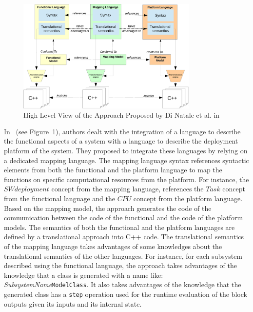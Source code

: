 \begin{figure}[ht!]
	\begin{center}
		\includegraphics[width=0.8\textwidth]{background/figs/diNatale}
		\caption{High Level View of the Approach Proposed by Di Natale et al. in~\cite{dinatale}}
		\label{fig:diNatale}
	\end{center}
\end{figure}

In~\cite{dinatale} (see Figure~\ref{fig:diNatale}), authors dealt with the integration of a language to describe the functional aspects of a system with a language to describe the deployment platform of the system. They proposed to integrate these languages by relying on a dedicated mapping language. The mapping language syntax references syntactic elements from both the functional and the platform language to map the functions on specific computational resources from the platform. For instance, the $SWdeployment$ concept from the mapping language, references the $Task$ concept from the functional language and the $CPU$ concept from the platform language. Based on the mapping model, the approach generates the code of the communication between the code of the functional and the code of the platform models. The semantics of both the functional and the platform languages are defined by a translational approach into C++ code. The translational semantics of the mapping language takes advantages of some knowledges about the translational semantics of the other languages. For instance, for each subsystem described using the functional language, the approach takes advantages of the knowledge that a class is generated with a name like: \emph{SubsystemName}\texttt{ModelClass}. It also takes advantages of the knowledge that the generated class has a \texttt{step} operation used for the runtime evaluation of the block outputs given its inputs and its internal state. 

